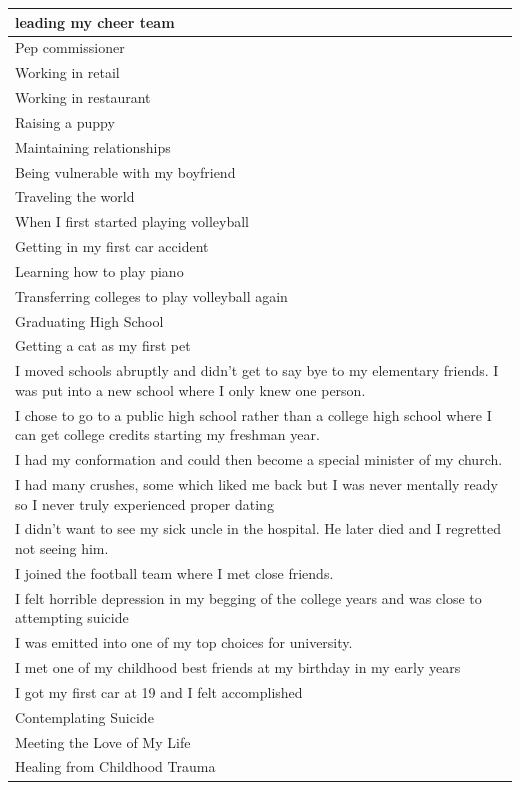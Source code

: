 \documentclass[
  .7em,
  letterpaper,
  DIV=11,
  numbers=noendperiod]{scrartcl}
\begin{document}
\begin{table}
\begin{tabular}{l}
leading my cheer team\\
\hline
Pep commissioner\\
\hline
Working in retail\\
\hline
Working in restaurant\\
\hline
Raising a puppy\\
\hline
Maintaining relationships\\
\hline
Being vulnerable with my boyfriend\\
\hline
Traveling the world\\
\hline
When I first started playing volleyball\\
\hline
Getting in my first car accident\\
\hline
Learning how to play piano\\
\hline
Transferring colleges to play volleyball again\\
\hline
Graduating High School\\
\hline
Getting a cat as my first pet\\
\hline
I moved schools abruptly and didn't get to say bye to my elementary friends. I was put into a new school where I only knew one person.\\
\hline
I chose to go to a public high school rather than a college high school where I can get college credits starting my freshman year.\\
\hline
I had my conformation and could then become a special minister of my church.\\
\hline
I had many crushes, some which liked me back but I was never mentally ready so I never truly experienced proper dating\\
\hline
I didn't want to see my sick uncle in the hospital. He later died and I regretted not seeing him.\\
\hline
I joined the football team where I met close friends.\\
\hline
I felt horrible depression in my begging of the college years and was close to attempting suicide\\
\hline
I was emitted into one of my top choices for university.\\
\hline
I met one of my childhood best friends at my birthday in my early years\\
\hline
I got my first car at 19 and I felt accomplished\\
\hline
Contemplating Suicide\\
\hline
Meeting the Love of My Life\\
\hline
Healing from Childhood Trauma\\

\end{tabular}
\end{table}
\end{document}
